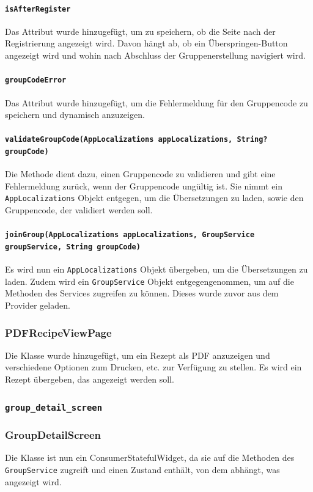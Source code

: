 \documentclass{implementierungsheft}
\begin{document}
\paragraph{\texttt{isAfterRegister}}
Das Attribut wurde hinzugefügt, um zu speichern, ob die Seite nach der Registrierung angezeigt wird. Davon hängt ab, ob ein Überspringen-Button angezeigt wird und wohin nach Abschluss der Gruppenerstellung navigiert wird.
\paragraph{\texttt{groupCodeError}}
Das Attribut wurde hinzugefügt, um die Fehlermeldung für den Gruppencode zu speichern und dynamisch anzuzeigen.
\paragraph*{\texttt{validateGroupCode(AppLocalizations appLocalizations, String? groupCode)}}
Die Methode dient dazu, einen Gruppencode zu validieren und gibt eine Fehlermeldung zurück, wenn der Gruppencode ungültig ist. Sie nimmt ein \texttt{AppLocalizations} Objekt entgegen, um die Übersetzungen zu laden, sowie den Gruppencode, der validiert werden soll.
\paragraph{\texttt{joinGroup(AppLocalizations appLocalizations, GroupService groupService, String groupCode)}}
Es wird nun ein \texttt{AppLocalizations} Objekt übergeben, um die Übersetzungen zu laden. Zudem wird ein \texttt{GroupService} Objekt entgegengenommen, um auf die Methoden des Services zugreifen zu können. Dieses wurde zuvor aus dem Provider geladen.
\subsubsection{PDFRecipeViewPage}
Die Klasse wurde hinzugefügt, um ein Rezept als PDF anzuzeigen und verschiedene Optionen zum Drucken, etc. zur Verfügung zu stellen. Es wird ein Rezept übergeben, das angezeigt werden soll.
\subsubsection{\texttt{group\_detail\_screen}}
\subsubsection*{GroupDetailScreen}
Die Klasse ist nun ein ConsumerStatefulWidget, da sie auf die Methoden des \texttt{GroupService} zugreift und einen Zustand enthält, von dem abhängt, was angezeigt wird.
\end{document}
